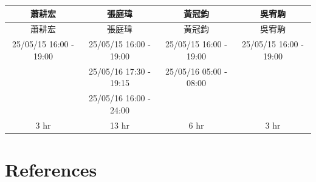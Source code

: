 \documentclass[12pt]{article}
\begin{document}
    \begin{CJK*}{UTF8}{bsmi}
        \begin{longtable}{c|c|c|c|}
            \hline
            蕭耕宏                    & 張庭瑋                    & 黃冠鈞                    & 吳宥駒                    \\
            \hline
            \endfirsthead
            \hline
            蕭耕宏                    & 張庭瑋                    & 黃冠鈞                    & 吳宥駒                    \\
            \hline
            \endhead
            \hline
            25/05/15 16:00 - 19:00 & 25/05/15 16:00 - 19:00 & 25/05/15 16:00 - 19:00 & 25/05/15 16:00 - 19:00 \\
            \hline
            & 25/05/16 17:30 - 19:15 & 25/05/16 05:00 - 08:00 &                        \\
            \hline
            & 25/05/16 16:00 - 24:00 &                        &                        \\
            \hline
            3 hr                   & 13 hr                  & 6 hr                   & 3 hr                   \\
            \hline
        \end{longtable}
    \end{CJK*}



    \section*{References}

    \printbibliography[heading=none]
\end{document}

